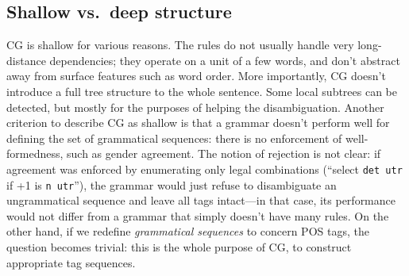 \subsection*{Shallow vs.~deep structure}\label{shallow-vs.deep-structure}

CG is shallow for various reasons. The rules do not usually handle very
long-distance dependencies; they operate on a unit of a few words, and
don't abstract away from surface features such as word order.
More importantly, CG doesn't introduce a full tree structure to the
whole sentence. Some local subtrees can be detected, but mostly
for the purposes of helping the disambiguation.
Another criterion to describe CG as shallow is that a grammar doesn't
perform well for defining the set of grammatical sequences: there is
no enforcement of well-formedness, such as gender agreement.
The notion of rejection is not clear: if agreement was enforced
by enumerating only legal combinations (``select \texttt{det utr} if
+1 is \texttt{n utr}''), the grammar would just refuse to disambiguate
an ungrammatical sequence and leave all tags intact---in that case,
its performance would not differ from a grammar that simply doesn't have many rules.
On the other hand, if we redefine \emph{grammatical sequences} to concern POS
tags, the question becomes trivial: this is the whole purpose of CG,
to construct appropriate tag sequences.



